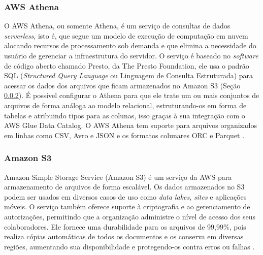 \subsubsection{AWS Athena}
\label{subsec:athena}

O AWS Athena, ou somente Athena, é um serviço de consultas de dados \textit{serverless}, isto é, que segue um modelo de execução de computação em nuvem alocando recursos de processamento sob demanda e que elimina a necessidade do usuário de gerenciar a infraestrutura do servidor. O serviço é baseado no \textit{software} de código aberto chamado Presto, da The Presto Foundation, ele usa o padrão SQL (\textit{Structured Query Language} ou Linguagem de Consulta Estruturada) para acessar os dados dos arquivos que ficam armazenados no Amazon S3 (Seção \ref{subsec:s3}). É possível configurar o Athena para que ele trate um ou mais conjuntos de arquivos de forma análoga ao modelo relacional, estruturando-os em forma de tabelas e atribuindo tipos para as colunas, isso graças à sua integração com o AWS Glue Data Catalog. O AWS Athena tem suporte para arquivos organizados em linhas como CSV, Avro e JSON e os formatos colunares ORC e Parquet \cite{aws:athena}.

\subsubsection{Amazon S3}
\label{subsec:s3}

Amazon Simple Storage Service (Amazon S3) é um serviço da AWS para armazenamento de arquivos de forma escalável. Os dados armazenados no S3 podem ser usados em diversos casos de uso como \textit{data lakes}, \textit{sites} e aplicações móveis. O serviço também oferece suporte à criptografia e ao gerenciamento de autorizações, permitindo que a organização administre o nível de acesso dos seus colaboradores. Ele fornece uma durabilidade para os arquivos de 99,99\%, pois realiza cópias automáticas de todos os documentos e os conserva em diversas regiões, aumentando sua disponibilidade e protegendo-os contra erros ou falhas \cite{aws:s3}.


